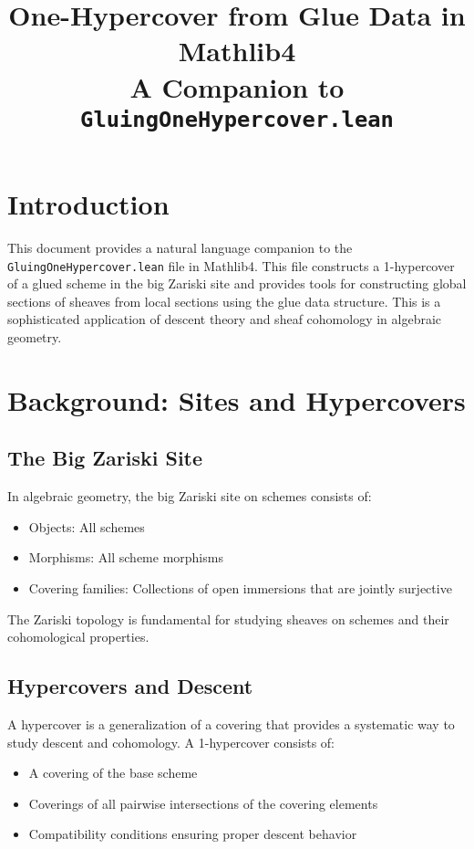 \documentclass{article}
\title{One-Hypercover from Glue Data in Mathlib4\\
\large A Companion to \texttt{GluingOneHypercover.lean}}
\author{}
\date{}
\theoremstyle{definition}
\begin{document}
\maketitle

\section{Introduction}

This document provides a natural language companion to the \texttt{GluingOneHypercover.lean} file in Mathlib4. This file constructs a 1-hypercover of a glued scheme in the big Zariski site and provides tools for constructing global sections of sheaves from local sections using the glue data structure. This is a sophisticated application of descent theory and sheaf cohomology in algebraic geometry.

\section{Background: Sites and Hypercovers}

\subsection{The Big Zariski Site}

In algebraic geometry, the big Zariski site on schemes consists of:
\begin{itemize}
\item Objects: All schemes
\item Morphisms: All scheme morphisms  
\item Covering families: Collections of open immersions that are jointly surjective
\end{itemize}

The Zariski topology is fundamental for studying sheaves on schemes and their cohomological properties.

\subsection{Hypercovers and Descent}

A hypercover is a generalization of a covering that provides a systematic way to study descent and cohomology. A 1-hypercover consists of:
\begin{itemize}
\item A covering of the base scheme
\item Coverings of all pairwise intersections of the covering elements
\item Compatibility conditions ensuring proper descent behavior
\end{itemize}
\end{document}
